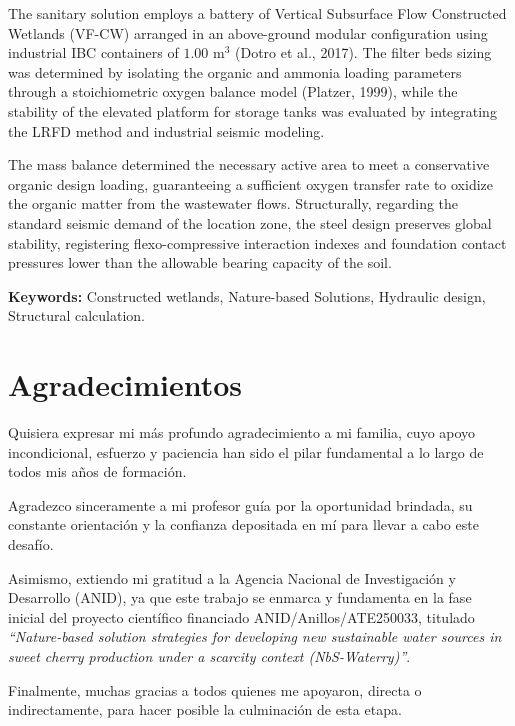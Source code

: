 \documentclass[12pt, letterpaper]{report}
\begin{document}
The sanitary solution employs a battery of Vertical Subsurface Flow Constructed Wetlands (VF-CW) arranged in an above-ground modular configuration using industrial IBC containers of $1.00\text{ m}^3$ (Dotro et al., 2017). The filter beds sizing was determined by isolating the organic and ammonia loading parameters through a stoichiometric oxygen balance model (Platzer, 1999), while the stability of the elevated platform for storage tanks was evaluated by integrating the LRFD method and industrial seismic modeling.

The mass balance determined the necessary active area to meet a conservative organic design loading, guaranteeing a sufficient oxygen transfer rate to oxidize the organic matter from the wastewater flows. Structurally, regarding the standard seismic demand of the location zone, the steel design preserves global stability, registering flexo-compressive interaction indexes and foundation contact pressures lower than the allowable bearing capacity of the soil.

\vspace{0.5cm}
\noindent\textbf{Keywords:} Constructed wetlands, Nature-based Solutions, Hydraulic design, Structural calculation.

\newpage


\chapter*{Agradecimientos}

Quisiera expresar mi más profundo agradecimiento a mi familia, cuyo apoyo incondicional, esfuerzo y paciencia han sido el pilar fundamental a lo largo de todos mis años de formación. 

Agradezco sinceramente a mi profesor guía por la oportunidad brindada, su constante orientación y la confianza depositada en mí para llevar a cabo este desafío. 

Asimismo, extiendo mi gratitud a la Agencia Nacional de Investigación y Desarrollo (ANID), ya que este trabajo se enmarca y fundamenta en la fase inicial del proyecto científico financiado ANID/Anillos/ATE250033, titulado \textit{``Nature-based solution strategies for developing new sustainable water sources in sweet cherry production under a scarcity context (NbS-Waterry)''}. 

Finalmente, muchas gracias a todos quienes me apoyaron, directa o indirectamente, para hacer posible la culminación de esta etapa.
\end{document}

